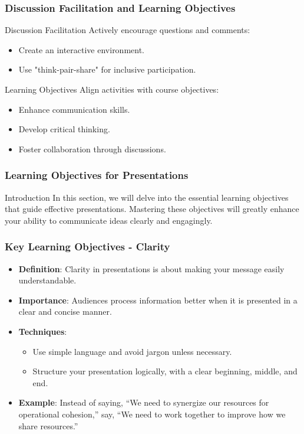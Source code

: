 \documentclass[aspectratio=169]{beamer}
\begin{document}
\begin{frame}[fragile]
    \frametitle{Discussion Facilitation and Learning Objectives}

    \begin{block}{Discussion Facilitation}
        Actively encourage questions and comments:
        \begin{itemize}
            \item Create an interactive environment.
            \item Use "think-pair-share" for inclusive participation.
        \end{itemize}
    \end{block}

    \begin{block}{Learning Objectives}
        Align activities with course objectives:
        \begin{itemize}
            \item Enhance communication skills.
            \item Develop critical thinking.
            \item Foster collaboration through discussions.
        \end{itemize}
    \end{block}
\end{frame}

\begin{frame}[fragile]
    \frametitle{Learning Objectives for Presentations}
    \begin{block}{Introduction}
        In this section, we will delve into the essential learning objectives that guide effective presentations. Mastering these objectives will greatly enhance your ability to communicate ideas clearly and engagingly.
    \end{block}
\end{frame}

\begin{frame}[fragile]
    \frametitle{Key Learning Objectives - Clarity}
    \begin{itemize}
        \item \textbf{Definition}: Clarity in presentations is about making your message easily understandable.
        \item \textbf{Importance}: Audiences process information better when it is presented in a clear and concise manner.
        \item \textbf{Techniques}:
        \begin{itemize}
            \item Use simple language and avoid jargon unless necessary.
            \item Structure your presentation logically, with a clear beginning, middle, and end.
        \end{itemize}
        \item \textbf{Example}: Instead of saying, ``We need to synergize our resources for operational cohesion,'' say, ``We need to work together to improve how we share resources.''
    \end{itemize}
\end{frame}
\end{document}
